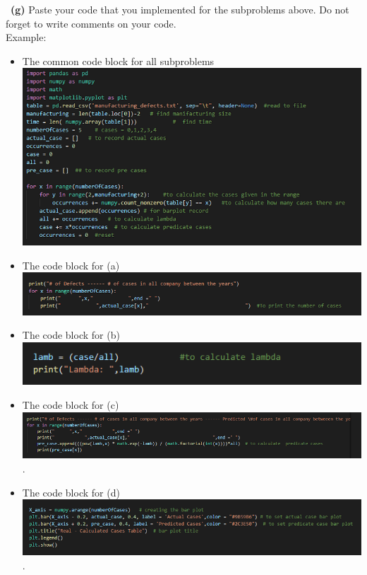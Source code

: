 \documentclass[a4 paper]{article}
\numberwithin{equation}{section}
\newcommand{\subproblem}[1]{~\newline\textbf{(#1)}}
\newcommand{\0}{\mathbf{0}}
\begin{document}
	\subproblem{g} Paste your code that you implemented for the subproblems above. Do not forget to write comments on your code.\\
	Example:\\
	\begin{itemize}
	\item The common code block for all subproblems\\
    \includegraphics{allsubproblem.png}
	\item The code block for (a)\\
    \includegraphics{aproblem.png}
	\item The code block for (b)\\
    \includegraphics{bproblem.png}
	\item The code block for (c)\\
	\includegraphics{cproblem.png}. 
	\item The code block for (d)\\
	\includegraphics{dproblem.png}.
	\end{itemize}
	
	
	
	
\end{document}
